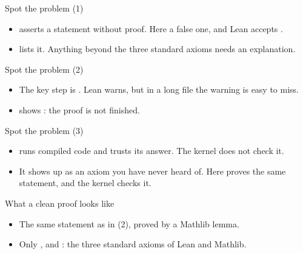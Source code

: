 \documentclass[10pt, aspectratio=169]{beamer}
\begin{document}
\begin{frame}[fragile,t]{Spot the problem (1)}

\pause
\begin{itemize}
\item {} asserts a statement without proof. Here a false one, and Lean accepts .
\item {} lists it. Anything beyond the three standard axioms needs an explanation.
\end{itemize}
\end{frame}

\begin{frame}[fragile,t]{Spot the problem (2)}

\pause
\begin{itemize}
\item The key step is . Lean warns, but in a long file the warning is easy to miss.
\item {} shows : the proof is not finished.
\end{itemize}
\end{frame}

\begin{frame}[fragile,t]{Spot the problem (3)}

\pause
\begin{itemize}
\item {} runs compiled code and trusts its answer. The kernel does not check it.
\item It shows up as an axiom you have never heard of. Here  proves the same statement, and the kernel checks it.
\end{itemize}
\end{frame}

\begin{frame}[fragile]{What a clean proof looks like}

\vspace{0.4em}
\begin{itemize}
\item The same statement as in (2), proved by a Mathlib lemma.
\item Only ,  and : the three standard axioms of Lean and Mathlib.
\end{itemize}
\end{frame}
\end{document}
